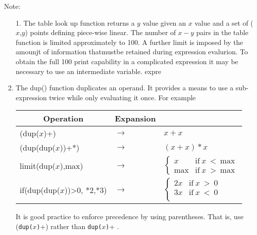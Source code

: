 Note:
\begin{enumerate}
\item[1.] The table look up function returns a $y$ value
given an $x$ value and a set of ($x$,$y$) points defining piece-wise linear.
The number of $x-y$ pairs in the table function is limited
approximately to 100.  A further limit is imposed by the amounjt of
information thatmustbe retained during expression evalurion.  To
obtain the full 100 print capability in a complicated expression it may be
necessary to use an intermediate variable.
expre

\item The dup() function duplicates an operand.
      It provides a means to use a sub-expression twice while only evaluating
      it once. For example 

      \medskip

      \begin{tabular}{lll}
       \multicolumn{1}{c}{Operation} &
       \multicolumn{1}{c}{Expansion} \\
       \hline
      (dup($x$)+)           & $\longrightarrow$ & $x + x$ \\
      (dup(dup($x$))+*)     & $\longrightarrow$ & $(x + x)*x$ \\
      limit(dup($x$),max) & $\longrightarrow$ & $ \left\{ \begin{array}{rl}
				      x & \mbox{if}~ x~ < ~ \mbox{max} \\
				      \mbox{max} & \mbox{if}~ x~ > ~ \mbox{max}
                                           \end{array} \right.$ \\ %
      if(dup(dup($x$))>0, *2,*3)&
			 $\longrightarrow$ & $ \left\{ \begin{array}{rl}
				      2x & \mbox{if}~ x~ > ~ 0 \\
				      3x & \mbox{if}~ x~ < ~ 0 \\
                                           \end{array} \right.$ %
      \end{tabular}

      \medskip

      \noindent
      It is good practice to enforce precedence by using parentheses. That
      is, use ({\tt dup($x$)}+) rather than {\tt dup($x$)}+ .
\end{enumerate}
